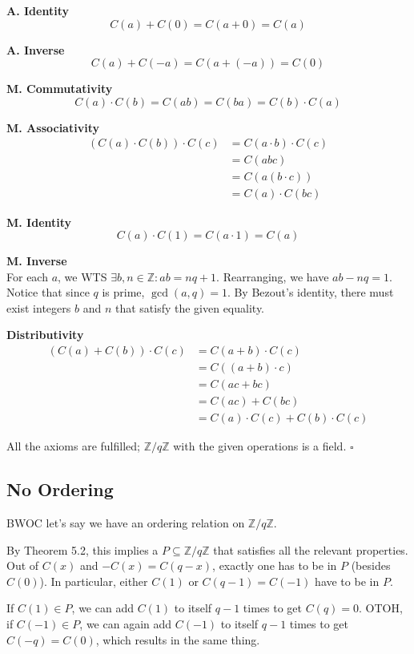 \documentclass[12pt]{article}
\begin{document}
\textbf{A. Identity}
\[C(a)+C(0)=C(a+0)=C(a)\]

\textbf{A. Inverse}
\[C(a)+C(-a)=C(a+(-a))=C(0)\]

\textbf{M. Commutativity}
\[C(a) \cdot C(b)=C(ab)=C(ba)=C(b) \cdot C(a)\]

\textbf{M. Associativity}
\begin{align*}
      (C(a) \cdot C(b)) \cdot C(c)
       & = C(a \cdot b) \cdot C(c) \\
       & = C(abc)                  \\
       & = C(a(b \cdot c))         \\
       & = C(a) \cdot C(bc)
\end{align*}

\textbf{M. Identity}
\[C(a) \cdot C(1)=C(a \cdot 1)=C(a)\]

\textbf{M. Inverse} \\
For each $a$, we WTS $\exists b, n \in \mathbb{Z}: ab=nq+1$.
Rearranging, we have $ab-nq=1$.
Notice that since $q$ is prime, $\gcd(a, q)=1$.
By Bezout's identity, there must exist integers $b$ and $n$
that satisfy the given equality.

\textbf{Distributivity}
\begin{align*}
      (C(a)+C(b)) \cdot C(c)
       & = C(a+b) \cdot C(c)                 \\
       & = C((a+b) \cdot c)                  \\
       & = C(ac+bc)                          \\
       & = C(ac)+C(bc)                       \\
       & = C(a) \cdot C(c) + C(b) \cdot C(c)
\end{align*}

All the axioms are fulfilled;
$\mathbb{Z}/q\mathbb{Z}$ with the given operations is a field. $\square$

\subsection{No Ordering}

BWOC let's say we have an ordering relation on $\mathbb{Z}/q\mathbb{Z}$.

By Theorem 5.2, this implies a $P \subseteq \mathbb{Z}/q\mathbb{Z}$
that satisfies all the relevant properties.
Out of $C(x)$ and $-C(x)=C(q-x)$, exactly
one has to be in $P$ (besides $C(0)$).
In particular, either $C(1)$ or $C(q-1)=C(-1)$ have to be in $P$.

If $C(1) \in P$, we can add $C(1)$ to itself $q-1$ times to get $C(q)=0$.
OTOH, if $C(-1) \in P$, we can again add $C(-1)$
to itself $q-1$ times to get $C(-q)=C(0)$, which results in the same thing.
\end{document}
